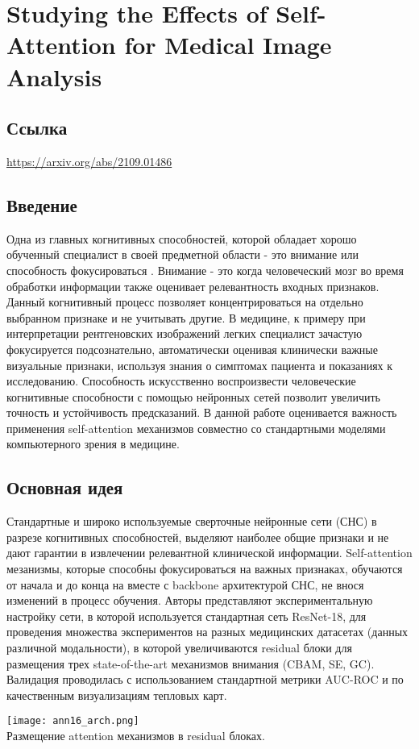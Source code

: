 \section{Studying the Effects of Self-Attention for Medical Image Analysis}

\subsection*{Ссылка} \url{https://arxiv.org/abs/2109.01486}
\subsection*{Введение}
Одна из главных когнитивных способностей, которой обладает хорошо обученный 
специалист в своей предметной области - это внимание или способность \glqq фокусироваться \grqq .
Внимание - это когда человеческий мозг во время обработки информации также 
оценивает релевантность входных признаков. Данный когнитивный процесс 
позволяет концентрироваться на отдельно выбранном признаке и не учитывать другие.
В медицине, к примеру при интерпретации рентгеновских изображений легких
специалист зачастую фокусируется подсознательно, автоматически оценивая 
клинически важные визуальные признаки, используя знания о симптомах пациента и показаниях
к исследованию. Способность искусственно воспроизвести человеческие 
когнитивные способности с помощью нейронных сетей позволит увеличить точность и 
устойчивость предсказаний. В данной работе оценивается важность применения self-attention механизмов 
совместно со стандартными моделями компьютерного зрения в медицине.
\subsection*{Основная идея}
Стандартные и широко используемые сверточные нейронные сети (СНС) в разрезе 
когнитивных способностей, выделяют наиболее общие признаки и не дают гарантии в 
извлечении релевантной клинической информации. Self-attention мезанизмы, которые способны 
фокусироваться на важных признаках, обучаются от начала и до конца на вместе 
с backbone архитектурой СНС, не внося изменений в процесс обучения. Авторы представляют 
экспериментальную настройку сети, в которой используется стандартная сеть ResNet-18, для 
проведения множества экспериментов на разных медицинских датасетах (данных различной модальности),
в которой увеличиваются residual блоки для размещения трех state-of-the-art 
механизмов внимания (CBAM, SE, GC). Валидация проводилась с использованием стандартной метрики AUC-ROC 
и по качественным визуализациям тепловых карт. \\
\begin{minipage}{1.0\linewidth}
    \begin{center}
        \texttt{[image: ann16\_arch.png]} \\
        \caption{\scriptsize{
            Размещение attention механизмов в residual блоках.
        }}
    \end{center}
    
\end{minipage}
